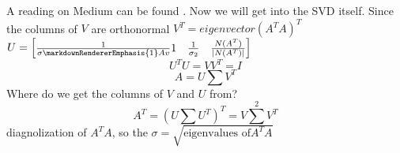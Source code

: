 A reading on Medium can be found . Now we will get into the SVD itself. Since the columns of $V$ are orthonormal\markdownRendererEllipsis{}\markdownRendererInterblockSeparator
{}\markdownRendererUlBegin
\markdownRendererUlItem $V^T = eigenvector(A^TA)^T$\markdownRendererUlItemEnd 
\markdownRendererUlItem $U = \begin{bmatrix}\frac{1}{\sigma\markdownRendererEmphasis{1}Av}1 & \frac{1}{\sigma_2} & \frac{N(A^T)}{|N(A^T)|}\end{bmatrix}$\markdownRendererUlItemEnd 
\markdownRendererUlEnd \markdownRendererInterblockSeparator
{}$$U^TU=VV^T=I$$\markdownRendererInterblockSeparator
{}$$A = U\sum V^T$$\markdownRendererInterblockSeparator
{}Where do we get the columns of $V$ and $U$ from?\markdownRendererInterblockSeparator
{}$$A^T = (U\sum U^T)^T=V\sum^2 V^T$$\markdownRendererInterblockSeparator
{}diagnolization of $A^TA$, so the $\sigma=\sqrt{\text{eigenvalues of}A^TA}$\relax